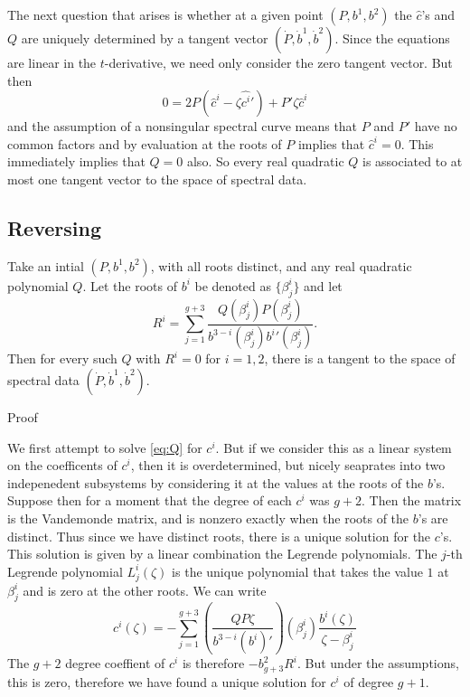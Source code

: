 The next question that arises is whether at a given point $(P,b^1,b^2)$ the $\hat c$'s and $Q$ are uniquely determined by a tangent vector $(\dot P, \dot b^1, \dot b^2)$. Since the equations are linear in the $t$-derivative, we need only consider the zero tangent vector. But then
\[
0 = 2P\left( \hat c^i - \zeta\hat {c^i}'\right) + P'\zeta\hat c^i
\]
and the assumption of a nonsingular spectral curve means that $P$ and $P'$ have no common factors and by evaluation at the roots of $P$ implies that $\hat c^i=0$. This immediately implies that $Q=0$ also. So every real quadratic $Q$ is associated to at most one tangent vector to the space of spectral data.


\subsection{Reversing}
\begin{lem}
Take an intial $(P,b^1,b^2)$, with all roots distinct, and any real quadratic polynomial $Q$. Let the roots of $b^i$ be denoted as $\{\beta^i_j\}$ and let
\[
R^i = \sum_{j=1}^{g+3} \frac{Q(\beta^i_j) P(\beta^i_j)}{b^{3-i}(\beta^i_j) {b^i}'(\beta^i_j)}.
\]
Then for every such $Q$ with $R^i = 0$ for $i=1,2$, there is a tangent to the space of spectral data $(\dot P, \dot b^1, \dot b^2)$.
\end{lem}

Proof

We first attempt to solve \eqref{eq:Q} for $c^i$. But if we consider this as a linear system on the coefficents of $c^i$, then it is overdetermined, but nicely seaprates into two indepenedent subsystems by considering it at the values at the roots of the $b$'s. Suppose then for a moment that the degree of each $c^i$ was $g+2$. Then the matrix is the Vandemonde matrix, and is nonzero exactly when the roots of the $b$'s are distinct. Thus since we have distinct roots, there is a unique solution for the $c$'s. This solution is given by a linear combination the Legrende polynomials. The $j$-th Legrende polynomial $L^i_j(\zeta)$ is the unique polynomial that takes the value $1$ at $\beta^i_j$ and is zero at the other roots. We can write
\[
c^i(\zeta) = - \sum_{j=1}^{g+3} \left( \frac{QP\zeta}{b^{3-i}(b^i)'}\right)(\beta^i_j) \frac{b^i(\zeta)}{\zeta-\beta^i_j}
\]
The $g+2$ degree coeffient of $c^i$ is therefore $-b^2_{g+3}R^i$. But under the assumptions, this is zero, therefore we have found a unique solution for $c^i$ of degree $g+1$.

